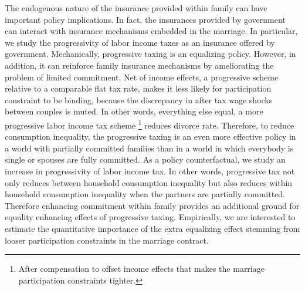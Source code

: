 The endogenous nature of the insurance provided within family can have important policy implications. In fact, the insurances provided by government can interact with insurance mechanisms embedded in the marriage. In particular, we study the progressivity of labor income taxes as an insurance offered by government. Mechanically, progressive taxing is an equalizing policy. However, in addition, it can reinforce family insurance mechanisms by ameliorating the problem of limited commitment. Net of income effects, a progressive scheme relative to a comparable flat tax rate, makes it less likely for participation constraint to be binding, because the discrepancy in after tax wage shocks between couples is muted. In other words, everything else equal, a more progressive labor income tax scheme \footnote{After compensation to offset income effects that makes the marriage participation constraints tighter.} reduces divorce rate. Therefore, to reduce consumption inequality, the progressive taxing is an even more effective policy in a world with partially committed families than in a world in which everybody is single or spouses are fully committed. As a policy counterfactual, we study an increase in progressivity of labor income tax. In other words, progressive tax not only reduces between household consumption inequality but also reduces within household consumption inequality when the partners are partially committed. Therefore enhancing commitment within family provides an additional ground for equality enhancing effects of progressive taxing. Empirically, we are interested to estimate the quantitative importance of the extra equalizing effect stemming from looser participation constraints in the marriage contract.  \\


